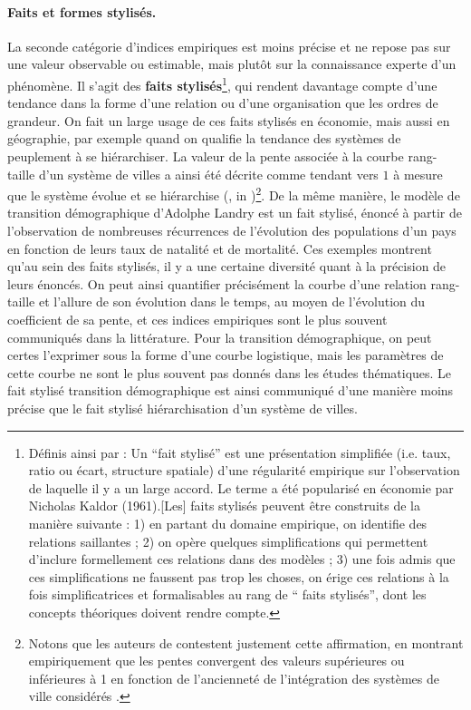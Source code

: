 \paragraph{Faits et formes stylisés.}
La seconde catégorie d'indices empiriques est moins précise et ne repose pas sur une valeur observable ou estimable, mais plutôt sur la connaissance experte d'un phénomène.
Il s'agit des \og \textbf{faits stylisés}\fg{}\footnote{
	Définis ainsi par \autocite{livet2014diversite}: \og
	Un ``fait stylisé'' est une présentation simplifiée (i.e. taux, ratio ou écart, structure spatiale) d'une régularité empirique sur l'observation de laquelle il y a un large accord.
	Le terme a été popularisé en économie par Nicholas Kaldor (1961).[Les] faits stylisés peuvent être construits de la manière suivante :
	1) en partant du domaine empirique, on identifie des relations saillantes ; 2) on opère quelques simplifications qui permettent d'inclure formellement ces relations dans des modèles ; 3) une fois admis que ces simplifications ne faussent pas trop les choses, on érige ces relations à la fois simplificatrices et formalisables au rang de `` faits stylisés'', dont les concepts théoriques doivent rendre compte.\fg{}
}, qui rendent davantage compte d'une tendance dans la forme d'une relation ou d'une organisation que les ordres de grandeur.
On fait un large usage de ces faits stylisés en économie, mais aussi en géographie, par exemple quand on qualifie la tendance des systèmes de peuplement à se hiérarchiser.
La valeur de la pente associée à la courbe rang-taille d'un système de villes a ainsi été décrite comme tendant vers $1$ à mesure que le système évolue et se hiérarchise (\cite{berry_city_2012}, in \cite[\S9]{pumain_multilevel_2015})\footnote{
	Notons que les auteurs de \textcite{pumain_multilevel_2015} contestent justement cette affirmation, en montrant empiriquement que les pentes convergent des valeurs supérieures ou inférieures à 1 en fonction de l'ancienneté de l'intégration des systèmes de ville considérés \autocite{cura_old_2017}.
}.
De la même manière, le modèle de transition démographique d'Adolphe Landry est un fait stylisé, énoncé à partir de l'observation de nombreuses récurrences de l'évolution des populations d'un pays en fonction de leurs taux de natalité et de mortalité.
Ces exemples montrent qu'au sein des faits stylisés, il y a une certaine diversité quant à la précision de leurs énoncés.
On peut ainsi quantifier précisément la courbe d'une relation rang-taille et l'allure de son évolution dans le temps, au moyen de l'évolution du coefficient de sa pente, et ces indices empiriques sont le plus souvent communiqués dans la littérature.
Pour la transition démographique, on peut certes l'exprimer sous la forme d'une courbe logistique, mais les paramètres de cette courbe ne sont le plus souvent pas donnés dans les études thématiques.
Le fait stylisé \og transition démographique\fg{} est ainsi communiqué d'une manière moins précise que le fait stylisé \og hiérarchisation d'un système de villes\fg{}.

